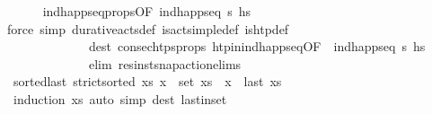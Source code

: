 \begin{isabellebody}
\ \ \ \ \isamarkupfalse%
\ ind{\isacharunderscore}{\kern0pt}happ{\isacharunderscore}{\kern0pt}seq{\isacharunderscore}{\kern0pt}props{\isacharparenleft}{\kern0pt}{}{\isacharparenright}{\kern0pt}{\isacharbrackleft}{\kern0pt}OF\ {\isacartoucheopen}ind{\isacharunderscore}{\kern0pt}happ{\isacharunderscore}{\kern0pt}seq\ {\isasympi}s\ hs{\isacartoucheclose}{\isacharbrackright}{\kern0pt}\isanewline
\ \ \ \ \isamarkupfalse%
{\isacharparenleft}{\kern0pt}force\ simp{\isacharcolon}{\kern0pt}\ durative{\isacharunderscore}{\kern0pt}acts{\isacharunderscore}{\kern0pt}def\ is{\isacharunderscore}{\kern0pt}act{\isacharunderscore}{\kern0pt}simple{\isacharunderscore}{\kern0pt}def\ is{\isacharunderscore}{\kern0pt}htp{\isacharunderscore}{\kern0pt}def\isanewline
\ \ \ \ \ \ \ \ \ \ \ \ \ dest{\isacharbang}{\kern0pt}{\isacharcolon}{\kern0pt}\ consec{\isacharunderscore}{\kern0pt}htps{\isacharunderscore}{\kern0pt}props{\isacharparenleft}{\kern0pt}{}{\isacharparenright}{\kern0pt}\ htp{\isacharunderscore}{\kern0pt}in{\isacharunderscore}{\kern0pt}ind{\isacharunderscore}{\kern0pt}happ{\isacharunderscore}{\kern0pt}seq{\isacharbrackleft}{\kern0pt}OF\ {\isacharunderscore}{\kern0pt}\ {\isacartoucheopen}ind{\isacharunderscore}{\kern0pt}happ{\isacharunderscore}{\kern0pt}seq\ {\isasympi}s\ hs{\isacartoucheclose}{\isacharbrackright}{\kern0pt}\isanewline
\ \ \ \ \ \ \ \ \ \ \ \ \ elim{\isacharbang}{\kern0pt}{\isacharcolon}{\kern0pt}\ res{\isacharunderscore}{\kern0pt}inst{\isacharunderscore}{\kern0pt}snap{\isacharunderscore}{\kern0pt}action{\isachardot}{\kern0pt}elims{\isacharparenright}{\kern0pt}\isanewline
{}\isamarkupfalse%
%
\endisatagproof
{\isafoldproof}%
%
\isadelimproof
\isanewline
%
\endisadelimproof
\isanewline
{}\isamarkupfalse%
\ sorted{\isacharunderscore}{\kern0pt}last{\isacharcolon}{\kern0pt}\ {\isachardoublequoteopen}{\isasymlbrakk}strict{\isacharunderscore}{\kern0pt}sorted\ xs{\isacharsemicolon}{\kern0pt}\ x\ {\isasymin}\ set\ xs{\isasymrbrakk}\ {\isasymLongrightarrow}\ x\ {\isasymle}\ last\ xs{\isachardoublequoteclose}\isanewline
%
\isadelimproof
\ \ %
\endisadelimproof
%
\isatagproof
{}\isamarkupfalse%
\ {\isacharparenleft}{\kern0pt}induction\ xs{\isacharparenright}{\kern0pt}\ {\isacharparenleft}{\kern0pt}auto\ simp{\isacharcolon}{\kern0pt}\ dest{\isacharbang}{\kern0pt}{\isacharcolon}{\kern0pt}\ last{\isacharunderscore}{\kern0pt}in{\isacharunderscore}{\kern0pt}set{\isacharparenright}{\kern0pt}%
\endisatagproof
{\isafoldproof}%
%
\isadelimproof
\isanewline
%
\endisadelimproof

\end{isabellebody}
